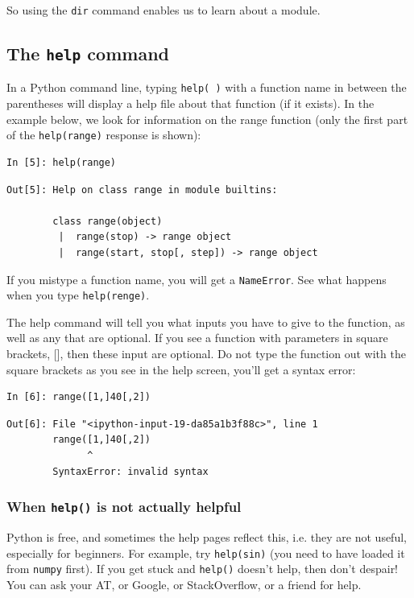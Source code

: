 \noindent So using the {\tt dir} command enables us to learn about a module. 

\subsection{The {\tt help} command}
In a Python command line, typing \texttt{help( )} with a function name in between the parentheses will display a help file about that function (if it exists). In the example below, we look for information on the range function (only the first part of the {\tt help(range)} response is shown):

\begin{lstlisting}[style=PY]
In [5]: help(range)
\end{lstlisting}

\begin{lstlisting}[style=PY_out]
Out[5]: Help on class range in module builtins:

        class range(object)
         |  range(stop) -> range object
         |  range(start, stop[, step]) -> range object
\end{lstlisting}

\noindent If you mistype a function name, you will get a {\tt NameError}. See what happens when you type {\tt help(renge)}.

\noindent The help command will tell you what inputs you have to give to the function, as well as any that are optional. If you see a function with parameters in square brackets, [], then these input are optional. Do not type the function out with the square brackets as you see in the help screen, you'll get a syntax error:

\begin{lstlisting}[style=PY]
In [6]: range([1,]40[,2])
\end{lstlisting}
\begin{lstlisting}[style=PY_out]
Out[6]: File "<ipython-input-19-da85a1b3f88c>", line 1
        range([1,]40[,2])
              ^
        SyntaxError: invalid syntax
\end{lstlisting}

\subsubsection{When {\tt help()} is not actually helpful}

Python is free, and sometimes the help pages reflect this, i.e. they are not useful, especially for beginners. For example, try {\tt help(sin)} (you need to have loaded it from {\tt numpy} first). If you get stuck and {\tt help()} doesn't help, then don't despair! You can ask your AT, or Google, or StackOverflow, or a friend for help.

